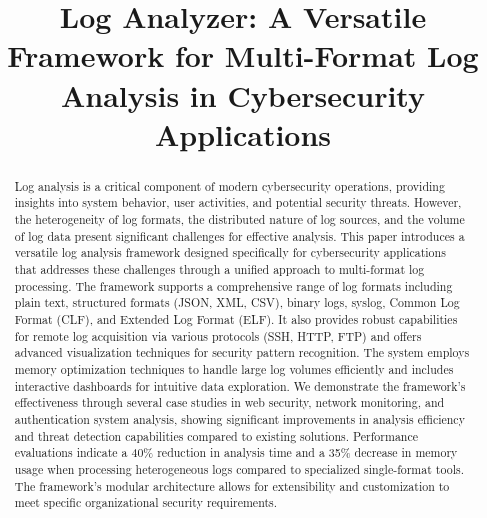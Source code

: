 \documentclass[conference]{IEEEtran}
\begin{document}
\title{Log Analyzer: A Versatile Framework for Multi-Format Log Analysis in Cybersecurity Applications}

\author{
\and
{}
\and
{}
}

\maketitle

\begin{abstract}
Log analysis is a critical component of modern cybersecurity operations, providing insights into system behavior, user activities, and potential security threats. However, the heterogeneity of log formats, the distributed nature of log sources, and the volume of log data present significant challenges for effective analysis. This paper introduces a versatile log analysis framework designed specifically for cybersecurity applications that addresses these challenges through a unified approach to multi-format log processing. The framework supports a comprehensive range of log formats including plain text, structured formats (JSON, XML, CSV), binary logs, syslog, Common Log Format (CLF), and Extended Log Format (ELF). It also provides robust capabilities for remote log acquisition via various protocols (SSH, HTTP, FTP) and offers advanced visualization techniques for security pattern recognition. The system employs memory optimization techniques to handle large log volumes efficiently and includes interactive dashboards for intuitive data exploration. We demonstrate the framework's effectiveness through several case studies in web security, network monitoring, and authentication system analysis, showing significant improvements in analysis efficiency and threat detection capabilities compared to existing solutions. Performance evaluations indicate a 40\% reduction in analysis time and a 35\% decrease in memory usage when processing heterogeneous logs compared to specialized single-format tools. The framework's modular architecture allows for extensibility and customization to meet specific organizational security requirements.
\end{abstract}
\end{document}
